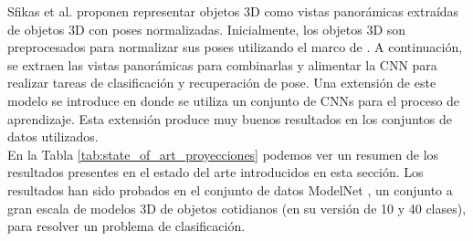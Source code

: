 Sfikas et al. \cite{sfikas2017exploiting} proponen representar objetos 3D como vistas panorámicas extraídas de objetos 3D con poses normalizadas. Inicialmente, los objetos 3D son preprocesados para normalizar sus poses utilizando el marco de  \cite{sfikas2014pose}. A continuación, se extraen las vistas panorámicas para combinarlas y alimentar la CNN para realizar tareas de clasificación y recuperación de pose. Una extensión de este modelo se introduce en \cite{SFIKAS2018208} donde se utiliza un conjunto de CNNs para el proceso de aprendizaje. Esta extensión produce muy buenos resultados en los conjuntos de datos utilizados.\\

En la Tabla \ref{tab:state_of_art_proyecciones} podemos ver un resumen de los resultados presentes en el estado del arte introducidos en esta sección. Los resultados han sido probados en el conjunto de datos ModelNet \cite{wu20153d}, un conjunto a gran escala de modelos 3D de objetos cotidianos (en su versión de 10 y 40 clases), para resolver un problema de clasificación.

\begin{table}[ht!]
\centering
{}
\caption{Resumen de los resultados presentes en el estado del arte de los métodos de representación de datos 3D mediante proyecciones.}
\label{tab:state_of_art_proyecciones}
\end{table}